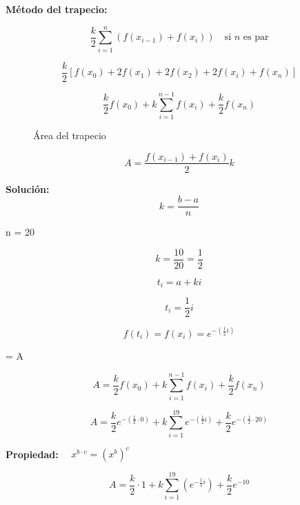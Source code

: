 \textbf{Método del trapecio:}

\[
\frac{k}{2} \sum_{i=1}^{n} \left( f(x_{i-1}) + f(x_i) \right) \quad \text{si } n \text{ es par}
\]

\[
\frac{k}{2} \left[ f(x_0) + 2f(x_1) + 2f(x_2) + 2f(x_i) + f(x_n) \right]
\]

\[
\frac{k}{2} f(x_0) + k \sum_{i=1}^{n-1} f(x_i) + \frac{k}{2} f(x_n)
\]

\begin{figure}[H]
\centering
{}
\caption{Área del trapecio}
\end{figure}

\[
A = \frac{f(x_{i-1}) + f(x_i)}{2} k
\]

\textbf{Solución:}
\[
k = \frac{b-a}{n}
\]

 n = 20

\[
k = \frac{10}{20} = \frac{1}{2}
\]

\[
t_i = a + k i
\]

\[
t_i = \frac{1}{2} i
\]

\[
f(t_i) = f(x_i) = e^{-\left(\frac{1}{2} i\right)}
\]

 = A

\[
A = \frac{k}{2} f(x_0) + k \sum_{i=1}^{n-1} f(x_i) + \frac{k}{2} f(x_n)
\]

\[
A = \frac{k}{2} e^{-\left(\frac{1}{2} \cdot 0\right)} + k \sum_{i=1}^{19} e^{-\left(\frac{1}{2} i\right)} + \frac{k}{2} e^{-\left(\frac{1}{2} \cdot 20\right)}
\]

\textbf{Propiedad:} $\quad x^{b \cdot c} = (x^b)^c$

\[
A = \frac{k}{2} \cdot 1 + k \sum_{i=1}^{19} \left( e^{-\frac{1}{2}i} \right) + \frac{k}{2} e^{-10}
\]

